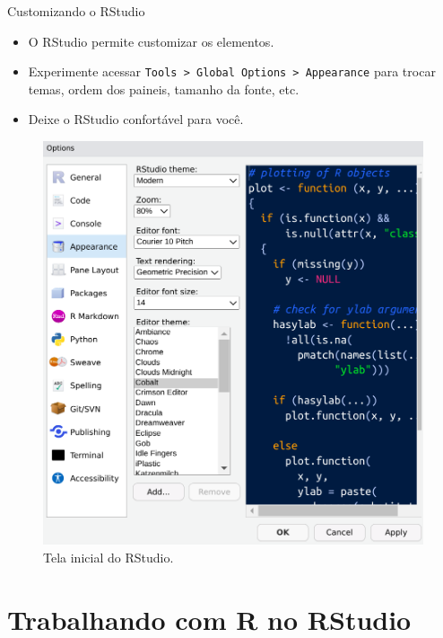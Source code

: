 \documentclass[
  ignorenonframetext,
  serif,
  professionalfont,
  usenames,
  dvipsnames,
  aspectratio = 169]{beamer}
\def\beginAHalfColumn{\begin{minipage}{0.49\textwidth}}%
\def\endColumns{\end{minipage}}%
\begin{document}
\begin{frame}[fragile]{Customizando o RStudio}
\protect\hypertarget{customizando-o-rstudio}{}
\beginAHalfColumn

\begin{itemize}
\item
  O RStudio permite customizar os elementos.
\item
  Experimente acessar
  \texttt{Tools\ \textgreater{}\ Global\ Options\ \textgreater{}\ Appearance}
  para trocar temas, ordem dos paineis, tamanho da fonte, etc.
\item
  Deixe o RStudio confortável para você.
\end{itemize}

\endColumns
\beginAHalfColumn

\begin{figure}

{\centering \includegraphics[width=0.85\linewidth]{./img/aparencia} 

}

\caption{Tela inicial do RStudio.}\label{fig:unnamed-chunk-9}
\end{figure}

\endColumns
\end{frame}

\hypertarget{trabalhando-com-r-no-rstudio}{%
\section{Trabalhando com R no
RStudio}\label{trabalhando-com-r-no-rstudio}}
\end{document}
